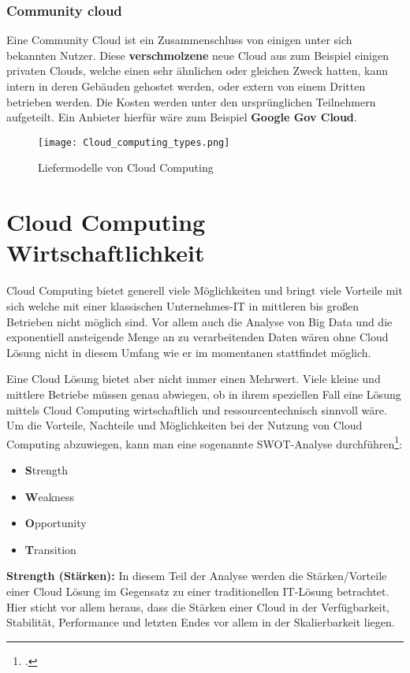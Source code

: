 \subsubsection{Community cloud}
Eine Community Cloud ist ein Zusammenschluss von einigen unter sich bekannten Nutzer.
Diese \textbf{verschmolzene} neue Cloud aus zum Beispiel einigen privaten Clouds, welche einen sehr ähnlichen oder gleichen Zweck hatten, kann intern in deren Gebäuden gehostet werden, oder extern von einem Dritten betrieben werden.
Die Kosten werden unter den ursprünglichen Teilnehmern aufgeteilt.
Ein Anbieter hierfür wäre zum Beispiel \textbf{Google Gov Cloud}.
\begin{center}
    \begin{figure}[H]
        \centering
        \texttt{[image: Cloud\_computing\_types.png]}
        \caption{Liefermodelle von Cloud Computing}
    \end{figure}
\end{center}
\section{Cloud Computing Wirtschaftlichkeit}
Cloud Computing bietet generell viele Möglichkeiten und bringt viele Vorteile mit sich welche mit einer klassischen Unternehmes-IT in mittleren bis großen Betrieben nicht möglich sind.
Vor allem auch die Analyse von Big Data und die exponentiell ansteigende Menge an zu verarbeitenden Daten wären ohne Cloud Lösung nicht in diesem Umfang wie er im momentanen stattfindet möglich.

Eine Cloud Lösung bietet aber nicht immer einen Mehrwert. Viele kleine und mittlere Betriebe müssen genau abwiegen, ob in ihrem speziellen Fall eine Lösung mittels Cloud Computing wirtschaftlich und ressourcentechnisch sinnvoll wäre.
\newpage
Um die Vorteile, Nachteile und Möglichkeiten bei der Nutzung von Cloud Computing abzuwiegen, kann man eine sogenannte SWOT-Analyse
durchführen\footcite{Lehrunterlagen-HTL-cloud}:
\begin{itemize}
	\item \textbf{S}trength
	\item \textbf{W}eakness
	\item \textbf{O}pportunity
	\item \textbf{T}ransition
\end{itemize}

\textbf{Strength (Stärken):} In diesem Teil der Analyse werden die Stärken/Vorteile einer Cloud Lösung im Gegensatz zu einer traditionellen
IT-Lösung betrachtet. Hier sticht vor allem heraus, dass die Stärken einer Cloud in der Verfügbarkeit, Stabilität,
Performance und letzten Endes vor allem in der Skalierbarkeit liegen.


